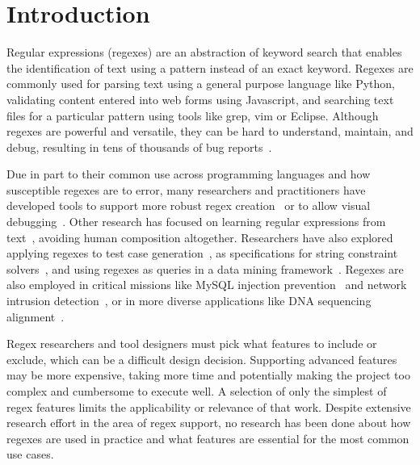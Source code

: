 \section{Introduction }

Regular expressions (regexes) are an abstraction of keyword search that enables the identification of text using a pattern instead of an exact keyword.
Regexes are commonly used for parsing text using a general purpose language like Python, validating content entered into web forms using Javascript, and searching text files for a particular pattern using tools like grep, vim or Eclipse.
Although regexes are powerful and versatile, they can be hard to understand,  maintain, and debug, resulting in tens of thousands of bug reports~\cite{Spishak:2012:TSR:2318202.2318207}.

Due in part to their common use across programming languages and how susceptible regexes are to error, many researchers and practitioners have developed tools to support more robust regex creation~\cite{Spishak:2012:TSR:2318202.2318207} or to allow visual debugging~\cite{Beck:2014:RVD:2591062.2591111}. Other research has focused on learning regular expressions from  text~\cite{Babbar:2010:CBA:1871840.1871848, Li:2008:REL:1613715.1613719}, avoiding human composition altogether.
Researchers have also explored applying regexes to test case generation~\cite{Ghosh:2013:JAT:2486788.2486925, Galler:2014:STD:2683035.2683100, Anand:2013:OSM:2503903.2503991, Tillmann:2014:TAT:2642937.2642941},
as specifications for string constraint solvers~\cite{Trinh:2014:SSS:2660267.2660372, hampi}, and using regexes as queries in a data mining framework~\cite{Begel:2010:CDE:1806799.1806821}.
Regexes are also employed in critical missions like MySQL injection prevention~\cite{Yeole:2011:ADT:1980022.1980229} and network intrusion detection~\cite{network}, or in more diverse applications like DNA sequencing alignment~\cite{1594922}.

Regex researchers and tool designers must pick what features to include or exclude, which  can be a difficult  design decision. Supporting advanced features may be more expensive, taking more time and potentially making the project too complex and cumbersome to execute well.  A selection of only the simplest of regex features limits the applicability or relevance of that work. Despite extensive research effort in the area of regex support,  no research has been done about how regexes are used in practice and what features are essential for the most common use cases.


